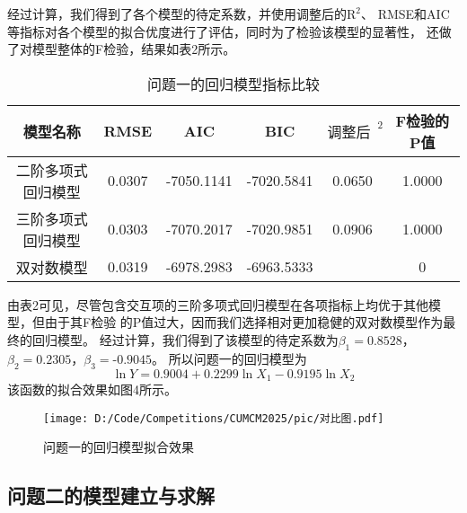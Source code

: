 \documentclass{cumcmthesis}
\begin{document}
            \par
            经过计算，我们得到了各个模型的待定系数，并使用调整后的$\text{R}^2$、
            RMSE和AIC等指标对各个模型的拟合优度进行了评估，同时为了检验该模型的显著性，
            还做了对模型整体的F检验，结果如表2所示。
             \begin{table}[htbp]
            \centering
            \begin{tabular}{cccccc}
            \hline
            {\textbf{模型名称}}  & {RMSE} &{AIC}&{BIC}&{$\text{调整后R}^2$}&{F检验的P值} \\
            \hline
            二阶多项式回归模型 & 0.0307 &-7050.1141 &-7020.5841 &0.0650 &1.0000
            \\
            三阶多项式回归模型 & 0.0303&-7070.2017&-7020.9851&0.0906 &1.0000
            
            \\
            双对数模型 & 0.0319&-6978.2983&-6963.5333&~&0
            \\
            \hline
            \end{tabular}
            \caption{问题一的回归模型指标比较}
            \end{table}
            \par
            由表2可见，尽管包含交互项的三阶多项式回归模型在各项指标上均优于其他模型，但由于其F检验
            的P值过大，因而我们选择相对更加稳健的双对数模型作为最终的回归模型。
            经过计算，我们得到了该模型的待定系数为$\beta_1=\text{0.8528}$，$\beta_2=\text{0.2305}$，$\beta_3=\text{-0.9045}$。
            所以问题一的回归模型为
            \begin{equation}
                \ln Y=0.9004 + 0.2299 \ln X_1 -0.9195 \ln X_2
            \end{equation}
            该函数的拟合效果如图4所示。
            \begin{figure}[htbp]
            \centering
            \texttt{[image: D:/Code/Competitions/CUMCM2025/pic/对比图.pdf]}
            \caption{问题一的回归模型拟合效果}
            \label{fi4}
            \end{figure}
        \subsection{问题二的模型建立与求解}
\end{document}
